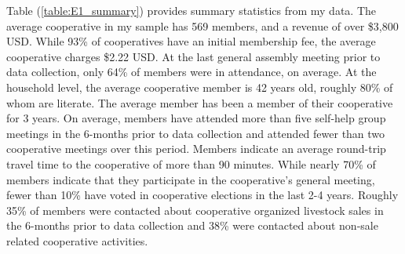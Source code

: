 \documentclass[11pt]{article}
\begin{document}
Table (\ref{table:E1_summary}) provides summary statistics from my data. The average cooperative in my sample has 569 members, and a revenue of over \$3,800 USD. While 93\% of cooperatives have an initial membership fee, the average cooperative charges \$2.22 USD. At the last general assembly meeting prior to data collection, only 64\% of members were in attendance, on average. At the household level, the average cooperative member is 42 years old, roughly 80\% of whom are literate. The average member has been a member of their cooperative for 3 years. On average, members have attended more than five self-help group meetings in the 6-months prior to data collection and attended fewer than two cooperative meetings over this period. Members indicate an average round-trip travel time to the cooperative of more than 90 minutes. While nearly 70\% of members indicate that they participate in the cooperative's general meeting, fewer than 10\% have voted in cooperative elections in the last 2-4 years. Roughly 35\% of members were contacted about cooperative organized livestock sales in the 6-months prior to data collection and 38\% were contacted about non-sale related cooperative activities. 
\end{document}
